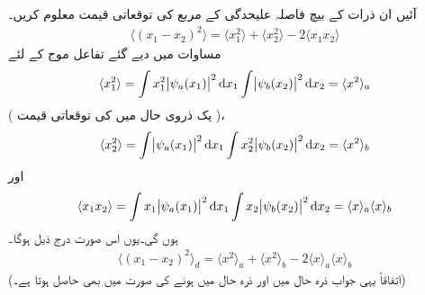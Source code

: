 آئیں ان ذرات کے بیچ فاصلہ علیحدگی کے مربع کی توقعاتی قیمت معلوم کریں۔
\begin{align}
	\langle(x_1-x_2)^2\rangle=\langle x^2_1\rangle+\langle x_2^2\rangle-2\langle x_1x_2\rangle
\end{align}
 مساوات  میں دیے گئے تفاعل موج کے لئے
\begin{align*}
	\langle x_1^2\rangle=\int x_1^2\abs{\psi_a(x_1)}^2\dif x_1\int\abs{\psi_b(x_2)}^2\dif x_2=\langle x^2\rangle_a
\end{align*}
 ( یک ذروی حال  میں  کی توقعاتی قیمت )، 
\begin{align*}
	\langle x_2^2\rangle=\int\abs{\psi_a(x_1)}^2\dif x_1\int x_2^2\abs{\psi_b(x_2)}^2\dif x_2=\langle x^2\rangle_b
\end{align*}
اور
\begin{align*}
	\langle x_1x_2 \rangle=\int x_1\abs{\psi_a(x_1)}^2\dif x_1\int x_2\abs{\psi_b(x_2)}^2\dif x_2=\langle x\rangle_a\langle x \rangle_b
\end{align*}
ہوں گی۔یوں اس صورت درج ذیل ہوگا۔
\begin{align}\label{مساوات_متماثل_قابل_ممیز_فاصلہ}
	\langle(x_1-x_2)^2\rangle_{d}=\langle x^2\rangle_a+\langle x^2 \rangle_b-2\langle x \rangle_a\langle x \rangle_b
\end{align}
(اتفاقاً یہی جواب ذرہ  حال  میں اور ذرہ  حال  میں ہونے کی صورت میں بھی حاصل ہوتا ہے۔)

